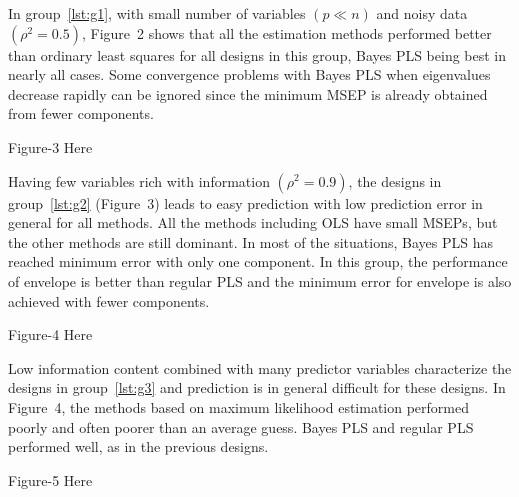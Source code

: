 \documentclass[a4paper, 11pt]{article}
\begin{document}
In group~\ref{lst:g1}, with small number of variables $(p \ll n)$ and noisy data
$(\rho^2 = 0.5)$, Figure~2 shows that all the estimation
methods performed better than ordinary least squares for all designs in this
group, Bayes PLS being best in nearly all cases. Some convergence problems with Bayes PLS when eigenvalues decrease rapidly
can be ignored since the minimum MSEP is already obtained from fewer components.

\begin{center}
 Figure-3 Here 
\end{center}


Having few variables rich with information $(\rho^2 = 0.9)$, the designs in group~\ref{lst:g2} (Figure~3) leads to easy prediction with low prediction error in general for all methods. All the methods including OLS have small MSEPs, but the other methods are still dominant. In most of the situations, Bayes PLS has reached minimum error with only one component. In this group, the performance of envelope is better than regular PLS and the minimum error for envelope is also achieved with fewer components. 

\begin{center}
 Figure-4 Here 
\end{center}


Low information content combined with many predictor variables characterize the designs in group~\ref{lst:g3} and prediction is in general difficult for these designs. In Figure~4, the methods based on maximum likelihood estimation performed poorly and often poorer than an average guess. Bayes PLS and regular PLS performed well, as in the previous designs.

\begin{center}
 Figure-5 Here 
\end{center}
\end{document}
